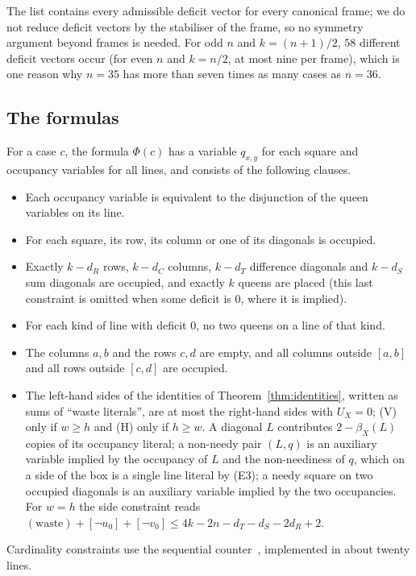 \documentclass[11pt]{article}
\theoremstyle{definition}
\theoremstyle{remark}
\newcommand{\dR}{d_R}
\newcommand{\dC}{d_C}
\newcommand{\dT}{d_T}
\newcommand{\dS}{d_S}
\begin{document}
The list contains every admissible deficit vector for every canonical frame; we do not reduce deficit
vectors by the stabiliser of the frame, so no symmetry argument beyond frames is needed. For odd $n$ and
$k=(n+1)/2$, $58$ different deficit vectors occur (for even $n$ and $k=n/2$, at most nine per frame),
which is one reason why $n=35$ has more than seven times as many cases as $n=36$.

\subsection{The formulas}

For a case $c$, the formula $\Phi(c)$ has a variable $q_{x,y}$ for each square and occupancy variables
for all lines, and consists of the following clauses.
\begin{itemize}
\item[DEF] Each occupancy variable is equivalent to the disjunction of the queen variables on its line.
\item[DOM] For each square, its row, its column or one of its diagonals is occupied.
\item[CARD] Exactly $k-\dR$ rows, $k-\dC$ columns, $k-\dT$ difference diagonals and $k-\dS$ sum diagonals
are occupied, and exactly $k$ queens are placed (this last constraint is omitted when some deficit is
$0$, where it is implied).
\item[AMO] For each kind of line with deficit $0$, no two queens on a line of that kind.
\item[FRAME] The columns $a,b$ and the rows $c,d$ are empty, and all columns outside $[a,b]$ and all rows
outside $[c,d]$ are occupied.
\item[(F), (V), (H)] The left-hand sides of the identities of Theorem~\ref{thm:identities}, written as
sums of ``waste literals'', are at most the right-hand sides with $U_X=0$; (V) only if $w\ge h$ and (H)
only if $h\ge w$. A diagonal $L$ contributes $2-\beta_X(L)$ copies of its occupancy literal; a non-needy
pair $(L,q)$ is an auxiliary variable implied by the occupancy of $L$ and the non-neediness of $q$,
which on a side of the box is a single line literal by (E3); a needy square on two occupied diagonals is
an auxiliary variable implied by the two occupancies. For $w=h$ the side constraint reads
$(\text{waste})+[\neg u_0]+[\neg v_0]\le 4k-2n-\dT-\dS-2\dR+2$.
\end{itemize}
Cardinality constraints use the sequential counter~\cite{Sinz}, implemented in about twenty lines.
\end{document}

